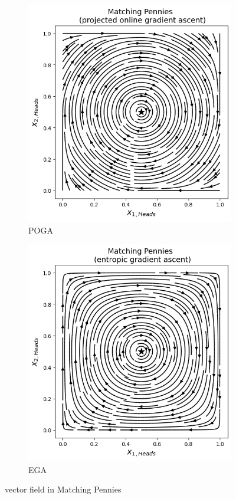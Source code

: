 \begin{figure}[H]
\centering
\begin{subfigure}{.5\textwidth}
    \centering
    \includegraphics[width=\textwidth]{logos/Pennies1.png}
    \caption{POGA}
\end{subfigure}%
\begin{subfigure}{.5\textwidth}
    \centering
    \includegraphics[width=\textwidth]{logos/Pennies2.png}
    \caption{EGA}
\end{subfigure}
\caption{vector field in Matching Pennies}
\label{fig:PenniesStream1}
\end{figure}


